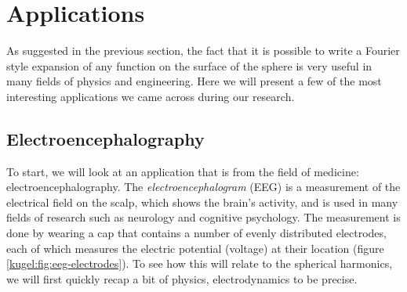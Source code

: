 
\section{Applications}

As suggested in the previous section, the fact that it is possible to write a
Fourier style expansion of any function on the surface of the sphere is very
useful in many fields of physics and engineering. Here we will present a few of
the most interesting applications we came across during our research.

\subsection{Electroencephalography}

\begin{figure}
  \centering
  \qquad
  \caption{
    \label{kugel:fig:eeg}
  }
\end{figure}

To start, we will look at an application that is from the field of medicine:
electroencephalography. The \emph{electroencephalogram} (EEG) is a measurement
of the electrical field on the scalp, which shows the brain's activity, and is
used in many fields of research such as neurology and cognitive psychology.  The
measurement is done by wearing a cap that contains a number of evenly
distributed electrodes, each of which measures the electric potential (voltage)
at their location (figure \ref{kugel:fig:eeg-electrodes}).  To see how this will
relate to the spherical harmonics, we will first quickly recap a bit of physics,
electrodynamics to be precise.

